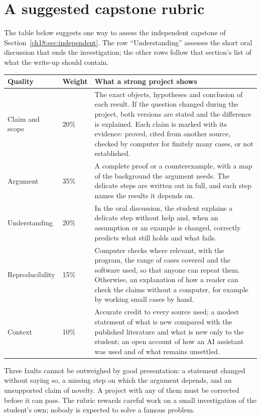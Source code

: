 \section{A suggested capstone rubric}\label{appC:sec:rubric}
The table below suggests one way to assess the independent capstone of Section~\ref{ch18:sec:independent}. The row ``Understanding'' assesses the short oral discussion that ends the investigation; the other rows follow that section's list of what the write-up should contain.
\begin{center}
\begin{tabularx}{\textwidth}{@{}p{1.15in}p{0.5in}X@{}}\toprule
Quality & Weight & What a strong project shows\\\midrule
Claim and scope & 20\% & The exact objects, hypotheses and conclusion of each result. If the question changed during the project, both versions are stated and the difference is explained. Each claim is marked with its evidence: proved, cited from another source, checked by computer for finitely many cases, or not established.\\
Argument & 35\% & A complete proof or a counterexample, with a map of the background the argument needs. The delicate steps are written out in full, and each step names the results it depends on.\\
Understanding & 20\% & In the oral discussion, the student explains a delicate step without help and, when an assumption or an example is changed, correctly predicts what still holds and what fails.\\
Reproducibility & 15\% & Computer checks where relevant, with the program, the range of cases covered and the software used, so that anyone can repeat them. Otherwise, an explanation of how a reader can check the claims without a computer, for example by working small cases by hand.\\
Context & 10\% & Accurate credit to every source used; a modest statement of what is new compared with the published literature and what is new only to the student; an open account of how an AI assistant was used and of what remains unsettled.\\\bottomrule
\end{tabularx}
\end{center}
Three faults cannot be outweighed by good presentation: a statement changed without saying so, a missing step on which the argument depends, and an unsupported claim of novelty. A project with any of them must be corrected before it can pass. The rubric rewards careful work on a small investigation of the student's own; nobody is expected to solve a famous problem.
